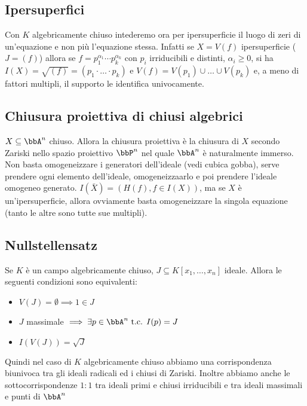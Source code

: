 \documentclass[a4paper,NoNotes,GeneralMath]{stdmdoc}
\begin{document}
	\subsection*{Ipersuperfici}
	Con $K$ algebricamente chiuso intederemo ora per ipersuperficie il luogo di zeri di un'equazione e non più l'equazione stessa. Infatti se $X = V(f)$ ipersuperficie ($J = (f)$) allora se $f = p_1^{\alpha_1} \cdots p_k^{\alpha_k}$ con $p_i$ irriducibili e distinti, $\alpha_i \ge 0$, si ha $I(X) = \sqrt{(f)} = (p_1 \cdot \ldots \cdot p_k)$ e $V(f) = V(p_1) \cup \ldots \cup V(p_k)$ e, a meno di fattori multipli, il supporto le identifica univocamente.
	
	\subsection*{Chiusura proiettiva di chiusi algebrici}
	$X \subseteq \bbA^n$ chiuso. Allora la chiusura proiettiva è la chiusura di $X$ secondo Zariski nello spazio proiettivo $\bbP^n$ nel quale $\bbA^n$ è naturalmente immerso. Non basta omogeneizzare i generatori dell'ideale (vedi cubica gobba), serve prendere ogni elemento dell'ideale, omogeneizzaarlo e poi prendere l'ideale omogeneo generato. $I(\bar{X}) = (H(f), f \in I(X))$, ma se $X$ è un'ipersuperficie, allora ovviamente basta omogeneizzare la singola equazione (tanto le altre sono tutte sue multipli).
	
	\subsection*{Nullstellensatz}
	Se $K$ è un campo algebricamente chiuso, $J \subseteq K[x_1, \ldots, x_n]$ ideale. Allora le seguenti condizioni sono equivalenti:
	\begin{itemize}
		\item $V(J) = \emptyset \implies 1 \in J$
		\item $J$ massimale $\implies \exists p \in \bbA^n \tc I(p) = J$
		\item $I(V(J)) = \sqrt{J}$
	\end{itemize}
	Quindi nel caso di $K$ algebricamente chiuso abbiamo una corrispondenza biunivoca tra gli ideali radicali ed i chiusi di Zariski. Inoltre abbiamo anche le sottocorrispondenze $1:1$ tra ideali primi e chiusi irriducibili e tra ideali massimali e punti di $\bbA^n$
	
\end{document}
